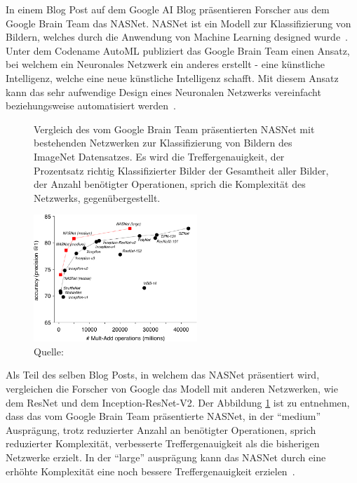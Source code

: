 In einem Blog Post auf dem Google AI Blog präsentieren Forscher aus dem Google Brain Team das NASNet. NASNet ist ein Modell zur Klassifizierung von Bildern, welches durch die Anwendung von Machine Learning designed wurde~\autocite{GoogleNasNet}. Unter dem Codename AutoML publiziert das Google Brain Team einen Ansatz, bei welchem ein Neuronales Netzwerk ein anderes erstellt - eine künstliche Intelligenz, welche eine neue künstliche Intelligenz schafft. Mit diesem Ansatz kann das sehr aufwendige Design eines Neuronalen Netzwerks vereinfacht beziehungsweise automatisiert werden~\autocite{GoogleAutoML}.

\begin{figure} 
    \caption{Vergleich des vom Google Brain Team präsentierten NASNet mit bestehenden Netzwerken zur Klassifizierung von Bildern des ImageNet Datensatzes. Es wird die Treffergenauigkeit, der Prozentsatz richtig Klassifizierter Bilder der Gesamtheit aller Bilder, der Anzahl benötigter Operationen, sprich die Komplexität des Netzwerks, gegenübergestellt.}
    \label{nasnet-comparision}
    \centering
    \includegraphics[width=0.55\textwidth]{graphics/nasnet-comparision.jpg}
    \caption*{Quelle: \textcite{GoogleNasNet}}
\end{figure}
Als Teil des selben Blog Posts, in welchem das NASNet präsentiert wird, vergleichen die Forscher von Google das Modell mit anderen Netzwerken, wie dem ResNet und dem Inception-ResNet-V2. Der Abbildung \ref{nasnet-comparision} ist zu entnehmen, dass das vom Google Brain Team präsentierte NASNet, in der \enquote{medium} Ausprägung, trotz reduzierter Anzahl an benötigter Operationen, sprich reduzierter Komplexität, verbesserte Treffergenauigkeit als die bisherigen Netzwerke erzielt. In der \enquote{large} ausprägung kann das NASNet durch eine erhöhte Komplexität eine noch bessere Treffergenauigkeit erzielen~\autocite{GoogleNasNet}.


